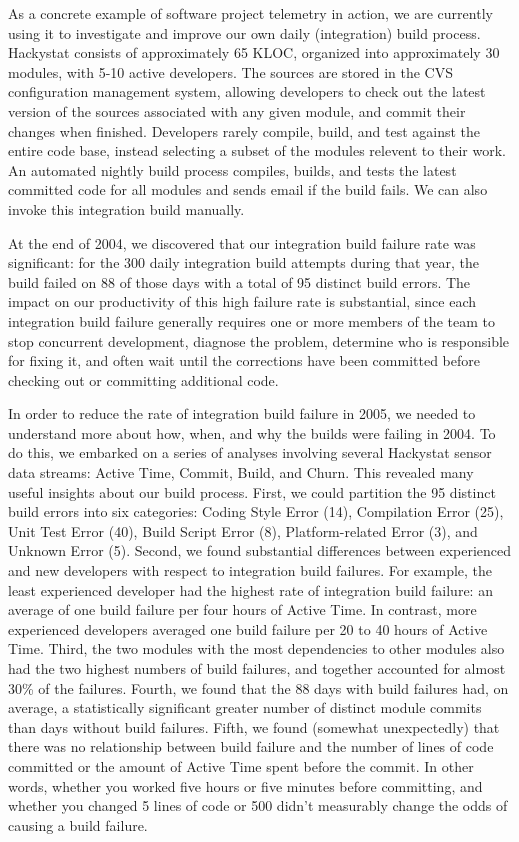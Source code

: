 \documentclass[11pt,twocolumn]{article}
\begin{document}

As a concrete example of software project telemetry in action, we are
currently using it to investigate and improve our own daily (integration)
build process.  Hackystat consists of approximately 65 KLOC, organized into
approximately 30 modules, with 5-10 active developers. The sources are
stored in the CVS configuration management system, allowing developers to
check out the latest version of the sources associated with any given
module, and commit their changes when finished.  Developers rarely compile,
build, and test against the entire code base, instead selecting a subset of
the modules relevent to their work.  An automated nightly build process
compiles, builds, and tests the latest committed code for all modules and
sends email if the build fails.  We can also invoke this integration build
manually.

At the end of 2004, we discovered that our integration build failure rate
was significant: for the 300 daily integration build attempts during that
year, the build failed on 88 of those days with a total of 95 distinct
build errors.  The impact on our productivity of this high failure rate is
substantial, since each integration build failure generally requires one or
more members of the team to stop concurrent development, diagnose the
problem, determine who is responsible for fixing it, and often wait until
the corrections have been committed before checking out or committing
additional code.

In order to reduce the rate of integration build failure in 2005, we needed
to understand more about how, when, and why the builds were failing in
2004. To do this, we embarked on a series of analyses involving several
Hackystat sensor data streams: Active Time, Commit, Build, and Churn.  This
revealed many useful insights about our build process.  First, we could
partition the 95 distinct build errors into six categories: Coding Style
Error (14), Compilation Error (25), Unit Test Error (40), Build Script
Error (8), Platform-related Error (3), and Unknown Error (5). Second, we
found substantial differences between experienced and new developers with
respect to integration build failures. For example, the least experienced
developer had the highest rate of integration build failure: an average of
one build failure per four hours of Active Time. In contrast, more
experienced developers averaged one build failure per 20 to 40 hours of
Active Time. Third, the two modules with the most dependencies to other
modules also had the two highest numbers of build failures, and together
accounted for almost 30\% of the failures. Fourth, we found that the 88
days with build failures had, on average, a statistically significant
greater number of distinct module commits than days without build failures.
Fifth, we found (somewhat unexpectedly) that there was no relationship
between build failure and the number of lines of code committed or the
amount of Active Time spent before the commit. In other words, whether you
worked five hours or five minutes before committing, and whether you
changed 5 lines of code or 500 didn't measurably change the odds of causing
a build failure.
\end{document}

